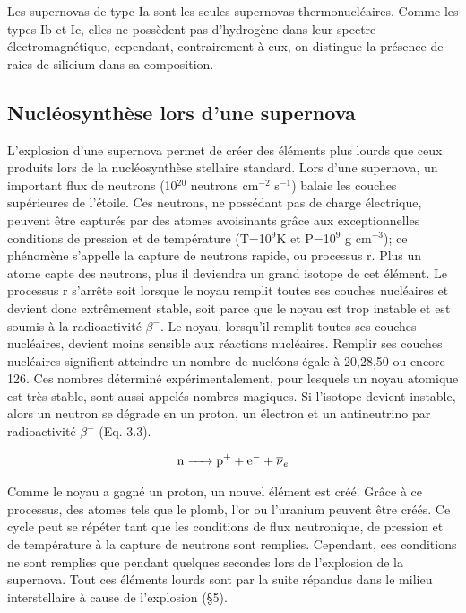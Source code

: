  Les supernovas de type Ia sont les seules supernovas thermonucléaires. Comme les types Ib et Ic, elles ne possèdent pas d'hydrogène dans leur spectre électromagnétique, cependant, contrairement à eux, on distingue la présence de raies de silicium dans sa composition. \bigskip
 
 \subsection{Nucléosynthèse lors d'une supernova} \medskip
 
 L'explosion d'une supernova permet de créer des éléments plus lourds que ceux produits lors de la nucléosynthèse stellaire standard. Lors d'une supernova, un important flux de neutrons (10$^{20}$ neutrons cm$^{-2}$ s$^{-1}$) balaie les couches supérieures de l'étoile. Ces neutrons, ne possédant pas de charge électrique, peuvent être capturés par des atomes avoisinants grâce aux exceptionnelles conditions de pression et de température (T=10$^{9}$K et P=10$^{9}$ g cm$^{-3}$); ce phénomène s'appelle la capture de neutrons rapide, ou processus r. %
 Plus un atome capte des neutrons, plus il deviendra un grand isotope de cet élément. Le processus r s'arrête soit lorsque le noyau remplit toutes ses couches nucléaires et devient donc extrêmement stable, soit parce que le noyau est trop instable et est soumis à la radioactivité $\beta^{-}$.\smallskip\newline
 Le noyau, lorsqu'il remplit toutes ses couches nucléaires, devient moins sensible aux réactions nucléaires. Remplir ses couches nucléaires signifient atteindre un nombre de nucléons égale à 20,28,50 ou encore 126. Ces nombres déterminé expérimentalement, pour lesquels un noyau atomique est très stable, sont aussi appelés nombres magiques.\smallskip\newline 
 Si l'isotope devient instable, alors un neutron se dégrade en un proton, un électron et un antineutrino  par radioactivité $\beta^{-}$ (Eq. 3.3). \bigskip
 
\begin{equation} \ce{n -> \ce{p+} + \ce{e-} + $\overline{\nu}$_{e}} \end{equation} \bigskip
 
 Comme le noyau a gagné un proton, un nouvel élément est créé. Grâce à ce processus, des atomes tels que le plomb, l'or ou l'uranium peuvent être créés. Ce cycle peut se répéter tant que les conditions de flux neutronique, de pression et de température à la capture de neutrons sont remplies. Cependant, ces conditions ne sont remplies que pendant quelques secondes lors de l'explosion de la supernova. Tout ces éléments lourds sont par la suite répandus dans le milieu interstellaire à cause de l'explosion (§5). \bigskip
 
